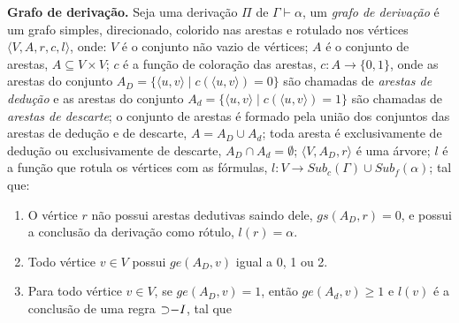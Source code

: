 \begin{definition}{\textbf{Grafo de derivação.}}
Seja uma derivação $\Pi$ de $\Gamma \vdash \alpha$, um \textit{grafo de derivação} é um grafo simples, direcionado, colorido nas arestas e rotulado nos vértices $\langle V, A, r, c, l\rangle$, onde: $V$ é o conjunto não vazio de vértices; $A$ é o conjunto de arestas, $A \subseteq V \times V$; $c$ é a função de coloração das arestas, $c: A \rightarrow \{0, 1\}$, onde as arestas do conjunto $A_D = \{\langle u, v\rangle \;|\; c(\langle u, v\rangle) = 0\}$ são chamadas de \textit{arestas de dedução} e as arestas do conjunto $A_d =  \{\langle u, v\rangle \;|\; c(\langle u, v\rangle) = 1\}$ são chamadas de \textit{arestas de descarte}; o conjunto de arestas é formado pela união dos conjuntos das arestas de dedução e de descarte, $A = A_D \cup A_d$; toda aresta é exclusivamente de dedução ou exclusivamente de descarte, $A_D \cap A_d = \emptyset$; $\langle V, A_D, r \rangle$ é uma árvore; $l$ é a função que rotula os vértices com as fórmulas, $l:V \rightarrow Sub_{c}(\Gamma) \cup Sub_{f}(\alpha)$; tal que:

\begin{enumerate}
    \item O vértice $r$ não possui arestas dedutivas saindo dele, $gs(A_D, r) = 0$, e possui a conclusão da derivação como rótulo, $l(r) = \alpha$.
    \item Todo vértice $v \in V$ possui $ge(A_D, v)$ igual a 0, 1 ou 2.
    \item Para todo vértice $v \in V$, se $ge(A_D, v) = 1$, então $ge(A_d, v) \geq 1$ e $l(v)$ é a conclusão de uma regra $\mathord{\supset}{-I}$, tal que
    
    \begin{center}
\end{center}
\end{enumerate}
\end{definition}
